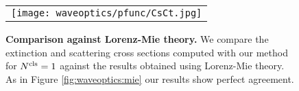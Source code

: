 \begin{figure}[h]
    \centering
    \setlength{\resLen}{5in}
    \addtolength{\tabcolsep}{-3pt}
    \begin{tabular}{c}
        \texttt{[image: waveoptics/pfunc/CsCt.jpg]} 
    \end{tabular}
    \caption[Comparison against Lorenz-Mie theory 2]{\label{fig:waveoptics:mie2}
        \textbf{Comparison against Lorenz-Mie theory.} We compare the extinction and scattering cross sections computed with our method for ${N^\text{cls}}=1$ against the results obtained using Lorenz-Mie theory. As in Figure \ref{fig:waveoptics:mie} our results show perfect agreement. 
	}
\end{figure}
